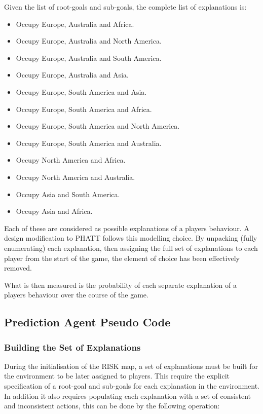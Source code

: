 \documentclass[parskip]{cs4rep}
\begin{document}
Given the list of root-goals and sub-goals, the complete list of explanations is:

\begin{itemize}
\item
Occupy Europe, Australia and Africa.
\item
Occupy Europe, Australia and North America.
\item
Occupy Europe, Australia and South America.
\item
Occupy Europe, Australia and Asia.
\item
Occupy Europe, South America and Asia.
\item
Occupy Europe, South America and Africa.
\item
Occupy Europe, South America and North America.
\item
Occupy Europe, South America and Australia.
\item
Occupy North America and Africa.
\item
Occupy North America and Australia.
\item
Occupy Asia and South America.
\item
Occupy Asia and Africa.
\end{itemize}

Each of these are considered as possible explanations of a players behaviour. A design modification to PHATT follows this modelling choice. By unpacking (fully enumerating) each explanation, then assigning the full set of explanations to each player from the start of the game, the element of choice has been effectively removed. 

What is then measured is the probability of each separate explanation of a players behaviour over the course of the game.

\subsection{Prediction Agent Pseudo Code}

\subsubsection{Building the Set of Explanations}

During the initialisation of the RISK map, a set of explanations must be built for the environment to be later assigned to players. This require the explicit specification of a root-goal and sub-goals for each explanation in the environment. In addition it also requires populating each explanation with a set of consistent and inconsistent actions, this can be done by the following operation:
\end{document}
